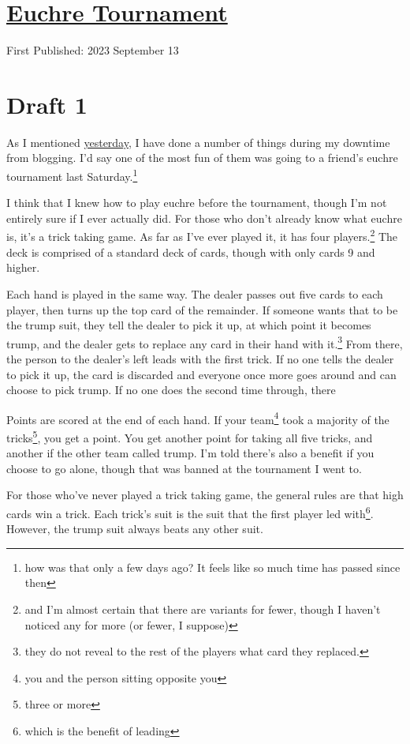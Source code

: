 \documentclass[12pt]{article}[titlepage]
\newcommand{\1}{\={a}}
\newcommand{\2}{\={e}}
\newcommand{\3}{\={\i}}
\newcommand{\4}{\=o}
\newcommand{\5}{\=u}
\newcommand{\6}{\={A}}
\renewcommand{\,}{\textsuperscript{,}}
\begin{document}
\doublespacing
\section{\href{euchre-tournament.html}{Euchre Tournament}}
First Published: 2023 September 13


\section{Draft 1}
As I mentioned \href{talk-planning-eclipse-1}{yesterday}, I have done a number of things during my downtime from blogging.
I'd say one of the most fun of them was going to a friend's euchre tournament last Saturday.\footnote{how was that only a few days ago? It feels like so much time has passed since then}

I think that I knew how to play euchre before the tournament, though I'm not entirely sure if I ever actually did.
For those who don't already know what euchre is, it's a trick taking game.
As far as I've ever played it, it has four players.\footnote{and I'm almost certain that there are variants for fewer, though I haven't noticed any for more (or fewer, I suppose)}
The deck is comprised of a standard deck of cards, though with only cards 9 and higher.

Each hand is played in the same way.
The dealer passes out five cards to each player, then turns up the top card of the remainder.
If someone wants that to be the trump suit, they tell the dealer to pick it up, at which point it becomes trump, and the dealer gets to replace any card in their hand with it.\footnote{they do not reveal to the rest of the players what card they replaced.}
From there, the person to the dealer's left leads with the first trick.
If no one tells the dealer to pick it up, the card is discarded and everyone once more goes around and can choose to pick trump.
If no one does the second time through, there

Points are scored at the end of each hand.
If your team\footnote{you and the person sitting opposite you} took a majority of the tricks\footnote{three or more}, you get a point.
You get another point for taking all five tricks, and another if the other team called trump.
I'm told there's also a benefit if you choose to go alone, though that was banned at the tournament I went to.

For those who've never played a trick taking game, the general rules are that high cards win a trick.
Each trick's suit is the suit that the first player led with\footnote{which is the benefit of leading}.
However, the trump suit always beats any other suit.
\end{document}
